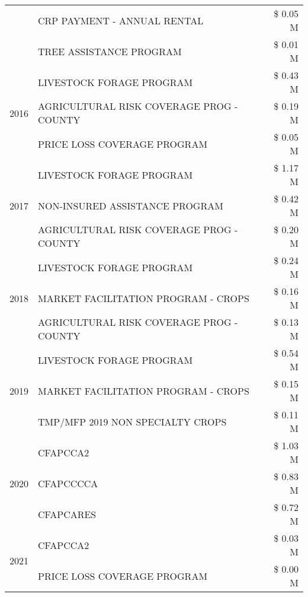 \begin{tabular}{llr}
 & CRP PAYMENT - ANNUAL RENTAL & \$ 0.05 M \\
 & TREE ASSISTANCE PROGRAM & \$ 0.01 M \\
\cline{1-3}
\multirow[t]{3}{*}{2016} & LIVESTOCK FORAGE PROGRAM & \$ 0.43 M \\
 & AGRICULTURAL RISK COVERAGE PROG - COUNTY & \$ 0.19 M \\
 & PRICE LOSS COVERAGE PROGRAM & \$ 0.05 M \\
\cline{1-3}
\multirow[t]{3}{*}{2017} & LIVESTOCK FORAGE PROGRAM & \$ 1.17 M \\
 & NON-INSURED ASSISTANCE PROGRAM & \$ 0.42 M \\
 & AGRICULTURAL RISK COVERAGE PROG - COUNTY & \$ 0.20 M \\
\cline{1-3}
\multirow[t]{3}{*}{2018} & LIVESTOCK FORAGE PROGRAM & \$ 0.24 M \\
 & MARKET FACILITATION PROGRAM - CROPS & \$ 0.16 M \\
 & AGRICULTURAL RISK COVERAGE PROG - COUNTY & \$ 0.13 M \\
\cline{1-3}
\multirow[t]{3}{*}{2019} & LIVESTOCK FORAGE PROGRAM & \$ 0.54 M \\
 & MARKET FACILITATION PROGRAM - CROPS & \$ 0.15 M \\
 & TMP/MFP 2019 NON SPECIALTY CROPS & \$ 0.11 M \\
\cline{1-3}
\multirow[t]{3}{*}{2020} & CFAPCCA2 & \$ 1.03 M \\
 & CFAPCCCCA & \$ 0.83 M \\
 & CFAPCARES & \$ 0.72 M \\
\cline{1-3}
\multirow[t]{2}{*}{2021} & CFAPCCA2 & \$ 0.03 M \\
 & PRICE LOSS COVERAGE PROGRAM & \$ 0.00 M \\
\cline{1-3}
\bottomrule
\end{tabular}
